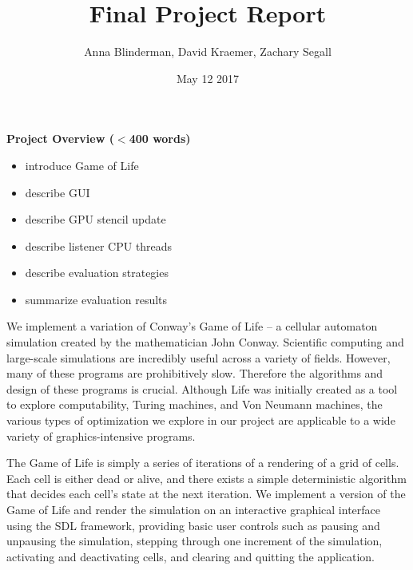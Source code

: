 \documentclass[12pt]{article}
\title{Final Project Report}
\author{Anna Blinderman, David Kraemer, Zachary Segall}
\date{May 12 2017}
\newcommand{\mybegit}{\vspace{-2mm} \begin{itemize} \itemsep-.6em }
\newcommand{\mytitle}[1]{\vspace{10mm} \noindent\begin{large} \textbf{{#1}} \end{large}}
\begin{document}
\maketitle


\mytitle{Project Overview ($<$400 words)}
\mybegit
	\item introduce Game of Life
	\item describe GUI
	\item describe GPU stencil update
	\item describe listener CPU threads
	\item describe evaluation strategies
	\item summarize evaluation results
\end{itemize}

	We implement a variation of Conway's Game of Life -- a cellular automaton simulation created by the mathematician John Conway. Scientific computing and large-scale simulations are incredibly useful across a variety of fields. However, many of these programs are prohibitively slow. Therefore the algorithms and design of these programs is crucial. Although Life was initially created as a tool to explore computability, Turing machines, and Von Neumann machines, the various types of optimization we explore in our project are applicable to a wide variety of graphics-intensive programs. 
	
	The Game of Life is simply a series of iterations of a rendering of a grid of cells. Each cell is either dead or alive, and there exists a simple deterministic algorithm that decides each cell's state at the next iteration. We implement a version of the Game of Life and render the simulation on
        an interactive graphical interface using the SDL framework, providing
        basic user controls such as pausing and unpausing the simulation,
        stepping through one increment of the simulation, activating and
        deactivating cells, and clearing and quitting the application.
	
\end{document}
